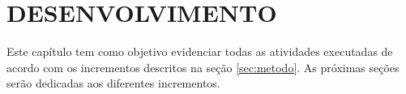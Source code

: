 
\chapter{DESENVOLVIMENTO}
\label{chap:desenvolvimento}
Este capítulo tem como objetivo evidenciar todas as atividades executadas de acordo com os incrementos descritos na seção \ref{sec:metodo}. As próximas seções serão dedicadas aos diferentes incrementos.








